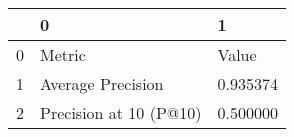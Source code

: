 \begin{tabular}{lll}
\toprule
 & 0 & 1 \\
\midrule
0 & Metric & Value \\
1 & Average Precision & 0.935374 \\
2 & Precision at 10 (P@10) & 0.500000 \\
\bottomrule
\end{tabular}
